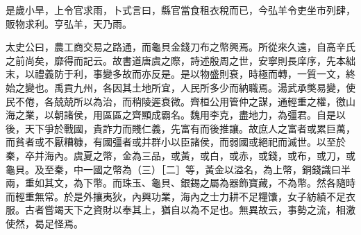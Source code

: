 是歲小旱，上令官求雨，卜式言曰，縣官當食租衣稅而已，今弘羊令吏坐市列肆，販物求利。亨弘羊，天乃雨。

太史公曰，農工商交易之路通，而龜貝金錢刀布之幣興焉。所從來久遠，自高辛氏之前尚矣，靡得而記云。故書道唐虞之際，詩述殷周之世，安寧則長庠序，先本絀末，以禮義防于利，事變多故而亦反是。是以物盛則衰，時極而轉，一質一文，終始之變也。禹貢九州，各因其土地所宜，人民所多少而納職焉。湯武承獘易變，使民不倦，各兢兢所以為治，而稍陵遲衰微。齊桓公用管仲之謀，通輕重之權，徼山海之業，以朝諸侯，用區區之齊顯成霸名。魏用李克，盡地力，為彊君。自是以後，天下爭於戰國，貴詐力而賤仁義，先富有而後推讓。故庶人之富者或累巨萬，而貧者或不厭糟糠，有國彊者或并群小以臣諸侯，而弱國或絕祀而滅世。以至於秦，卒并海內。虞夏之幣，金為三品，或黃，或白，或赤，或錢，或布，或刀，或龜貝。及至秦，中一國之幣為（三）［二］等，黃金以溢名，為上幣，銅錢識曰半兩，重如其文，為下幣。而珠玉、龜貝、銀錫之屬為器飾寶藏，不為幣。然各隨時而輕重無常。於是外攘夷狄，內興功業，海內之士力耕不足糧馕，女子紡績不足衣服。古者嘗竭天下之資財以奉其上，猶自以為不足也。無異故云，事勢之流，相激使然，曷足怪焉。